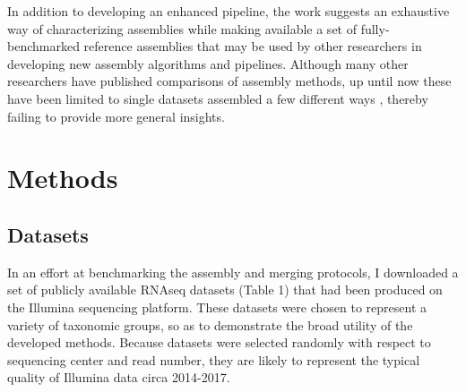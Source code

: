 \documentclass[10pt,letterpaper]{article}
\begin{document}
In addition to developing an enhanced pipeline, the work suggests an exhaustive way of characterizing assemblies while making available a set of fully-benchmarked reference assemblies that may be used by other researchers in developing new assembly algorithms and pipelines. Although many other researchers have published comparisons of assembly methods, up until now these have been limited to single datasets assembled a few different ways \citep{Marchant:2016hl, Finseth:2014bl}, thereby failing to provide more general insights.     




\section{Methods}

\subsection{Datasets}

In an effort at benchmarking the assembly and merging protocols, I downloaded a set of publicly available RNAseq datasets (Table 1) that had been produced on the Illumina sequencing platform. These datasets were chosen to represent a variety of taxonomic groups, so as to demonstrate the broad utility of the developed methods. Because datasets were selected randomly with respect to sequencing center and read number, they are likely to represent the typical quality of Illumina data circa 2014-2017. 
\end{document}
